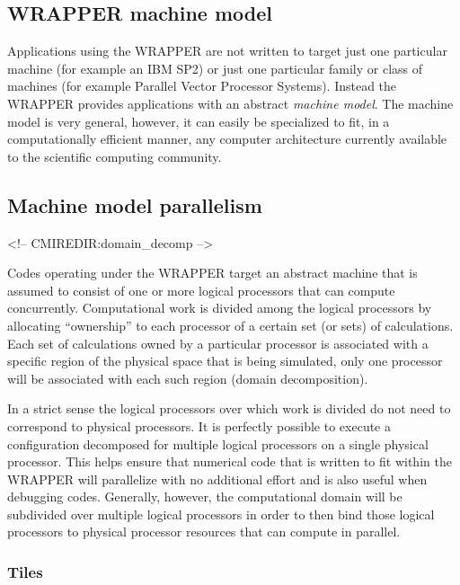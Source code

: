 \subsection{WRAPPER machine model}

Applications using the WRAPPER are not written to target just one 
particular machine (for example an IBM SP2) or just one particular family or 
class of machines (for example Parallel Vector Processor Systems). Instead the
WRAPPER provides applications with an 
abstract {\it machine model}. The machine model is very general, however, it can
easily be specialized to fit, in a computationally efficient manner, any 
computer architecture currently available to the scientific computing community.

\subsection{Machine model parallelism}
\begin{rawhtml}
<!-- CMIREDIR:domain_decomp -->
\end{rawhtml}

 Codes operating under the WRAPPER target an abstract machine that is assumed to
consist of one or more logical processors that can compute concurrently.  
Computational work is divided among the logical
processors by allocating ``ownership'' to 
each processor of a certain set (or sets) of calculations. Each set of 
calculations owned by a particular processor is associated with a specific 
region of the physical space that is being simulated, only one processor will 
be associated with each such region (domain decomposition).  

In a strict sense the logical processors over which work is divided do not need 
to correspond to physical processors. It is perfectly possible to execute a 
configuration decomposed for multiple logical processors on a single physical 
processor. This helps ensure that numerical code that is written to fit
within the WRAPPER will parallelize with no additional effort and is
also useful when debugging codes. Generally, however,
the computational domain will be subdivided over multiple logical
processors in order to then bind those logical processors to physical 
processor resources that can compute in parallel.

\subsubsection{Tiles}

